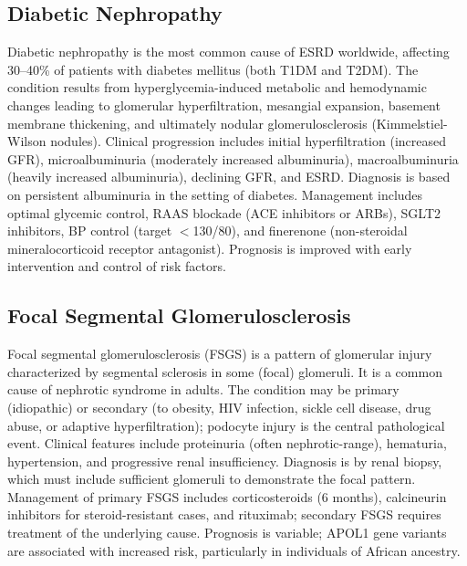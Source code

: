 


\label{sec:Glomerular Diseases}

\subsection{Diabetic Nephropathy}
\label{sec:Diabetic Nephropathy}
Diabetic nephropathy is the most common cause of ESRD worldwide, affecting 30--40\% of patients with diabetes mellitus (both T1DM and T2DM). The condition results from hyperglycemia-induced metabolic and hemodynamic changes leading to glomerular hyperfiltration, mesangial expansion, basement membrane thickening, and ultimately nodular glomerulosclerosis (Kimmelstiel-Wilson nodules). Clinical progression includes initial hyperfiltration (increased GFR), microalbuminuria (moderately increased albuminuria), macroalbuminuria (heavily increased albuminuria), declining GFR, and ESRD. Diagnosis is based on persistent albuminuria in the setting of diabetes. Management includes optimal glycemic control, RAAS blockade (ACE inhibitors or ARBs), SGLT2 inhibitors, BP control (target $<$130/80), and finerenone (non-steroidal mineralocorticoid receptor antagonist). Prognosis is improved with early intervention and control of risk factors.

\subsection{Focal Segmental Glomerulosclerosis}
\label{sec:Focal Segmental Glomerulosclerosis}
Focal segmental glomerulosclerosis (FSGS) is a pattern of glomerular injury characterized by segmental sclerosis in some (focal) glomeruli. It is a common cause of nephrotic syndrome in adults. The condition may be primary (idiopathic) or secondary (to obesity, HIV infection, sickle cell disease, drug abuse, or adaptive hyperfiltration); podocyte injury is the central pathological event. Clinical features include proteinuria (often nephrotic-range), hematuria, hypertension, and progressive renal insufficiency. Diagnosis is by renal biopsy, which must include sufficient glomeruli to demonstrate the focal pattern. Management of primary FSGS includes corticosteroids (6 months), calcineurin inhibitors for steroid-resistant cases, and rituximab; secondary FSGS requires treatment of the underlying cause. Prognosis is variable; APOL1 gene variants are associated with increased risk, particularly in individuals of African ancestry.

